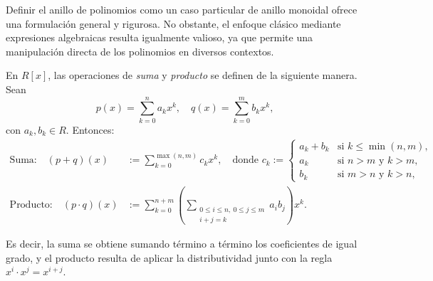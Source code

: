 		Definir el anillo de polinomios como un caso particular de anillo monoidal ofrece una formulación general y rigurosa. No obstante, el enfoque clásico mediante expresiones algebraicas resulta igualmente valioso, ya que permite una manipulación directa de los polinomios en diversos contextos.\medskip




\begin{definicion}\label{ñlkjpoiuyy}
\end{definicion}



\vspace{0.5cm}
En \( R[x] \), las operaciones de \textit{suma} y \textit{producto} se definen de la siguiente manera. Sean
\[
p(x) = \sum_{k = 0}^n a_k x^k, \quad q(x) = \sum_{k = 0}^m b_k x^k,
\]
con \( a_k, b_k \in R \). Entonces:
\begin{align*}
	\text{Suma:} \quad (p + q)(x) &:= \sum_{k = 0}^{\max(n,m)} c_k x^k, \quad \text{donde } c_k :=
	\begin{cases}
		a_k + b_k & \text{si } k \leq \min(n,m), \\[4pt]
		a_k & \text{si } n > m \text{ y } k > m, \\[4pt]
		b_k & \text{si } m > n \text{ y } k > n,
	\end{cases} \\[10pt]
	\text{Producto:} \quad (p \cdot q)(x) &:= \sum_{k = 0}^{n+m} \left( \sum_{\substack{0 \leq i \leq n,\: 0 \leq j \leq m \\ i + j = k}} a_i b_j \right) x^k.
\end{align*}

\noindent Es decir, la suma se obtiene sumando término a término los coeficientes de igual grado, y el producto resulta de aplicar la distributividad junto con la regla \( x^i \cdot x^j = x^{i+j} \).\\

